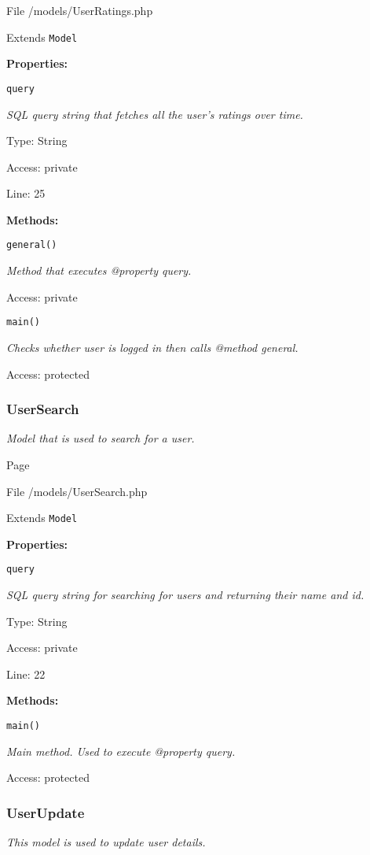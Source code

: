 File /models/UserRatings.php

Extends \texttt{Model}

\textbf{Properties:}

\texttt{query}

{\scriptsize
\textit{SQL query string that fetches all the user's ratings over time.}

Type: String

Access: private

Line: 25

}
\textbf{Methods:}

\texttt{general()}

{\scriptsize
\textit{Method that executes @property query.}

Access: private

}

\texttt{main()}

{\scriptsize
\textit{Checks whether user is logged in then calls @method general.}

Access: protected

}

\subsubsection{UserSearch}
\textit{Model that is used to search for a user.}

Page \pageref{UserSearch.php}

File /models/UserSearch.php

Extends \texttt{Model}

\textbf{Properties:}

\texttt{query}

{\scriptsize
\textit{SQL query string for searching for users and returning their name and id.}

Type: String

Access: private

Line: 22

}
\textbf{Methods:}

\texttt{main()}

{\scriptsize
\textit{Main method.
Used to execute @property query.}

Access: protected

}

\subsubsection{UserUpdate}
\textit{This model is used to update user details.}

